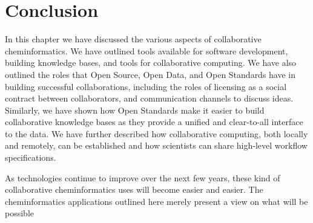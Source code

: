\documentclass[11pt]{book}
\begin{document}
\section{Conclusion}

In this chapter we have discussed the various aspects of collaborative
cheminformatics. We have outlined tools available for software development,
building knowledge bases, and tools for collaborative computing.
We have also outlined the roles that Open Source, Open Data, and Open Standards
have in building successful collaborations, including the roles of
licensing as a social contract between collaborators, and communication
channels to discuss ideas. Similarly, we have shown how Open Standards
make it easier to build collaborative knowledge bases as they
provide a unified and clear-to-all interface to the data. We have
further described how collaborative computing, both locally and
remotely, can be established and how scientists can share high-level
workflow specifications.

As technologies continue to improve over the next few years, these kind of
collaborative cheminformatics uses will become easier and easier.
The cheminformatics applications outlined here merely present
a view on what will be possible



\end{document}
